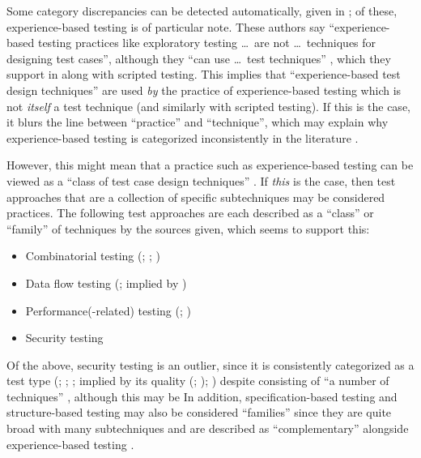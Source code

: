 

\ifnotpaper\else\fi

\label{multiCats}

Some category discrepancies can be detected automatically, given in
; of these, experience-based testing is of particular note.
\expBasedCatMain{} These authors say ``experience-based testing practices like
exploratory testing \dots\ are not \dots\ techniques for designing test cases'',
although they ``can use \dots\ test techniques'' \citeyearpar[p.~viii]{IEEE2021},
which they support in \citeyearpar[p.~33]{IEEE2022} along with scripted testing.
This implies that ``experience-based test design techniques'' are used \emph{by}
the practice of experience-based testing which is not \emph{itself} a test
technique (and similarly with scripted testing). If this is the case, it blurs
the line between ``practice'' and ``technique'', which may explain why
experience-based testing is categorized inconsistently in the literature%
.

\ifnotpaper
    \label{classFamilyDiscrep}
    However, this might mean that a practice such as experience-based testing
    can be viewed as a ``class of test case design techniques''
    \citep[p.~4]{IEEE2022}. If \emph{this} is the case, then test approaches
    that are a collection of specific subtechniques may be considered
    practices. The following test approaches are each described as a ``class''
    or ``family'' of techniques by the sources given, which seems to support
    this:
    \begin{itemize}
        \item Combinatorial testing (\citealp[p.~3]{IEEE2022};
              \citeyear[p.~2]{IEEE2021}; \citealp[p.~5-11]{SWEBOK2024})
        \item Data flow testing (\citeyear[p.~3]{IEEE2021};
              implied by \citealp[p.~5-13]{SWEBOK2024})
        \item Performance(-related) testing (\citealp[p.~38]{IEEE2021};
              \perfAsFamily*{})
        \item Security testing \citep[implied by][p.~40]{IEEE2021}
    \end{itemize}
    Of the above, security testing is an outlier, since it is consistently
    categorized as a test type (\citealp[pp.~9, 22, 26--27]{IEEE2022};
    \citeyear[pp.~7, 40, Tab.~A.1]{IEEE2021}; \citeyear[p.~405]{IEEE2017}%
    ; implied by its quality (\citealp{ISO_IEC2023a};
    \citealp[p.~13-4]{SWEBOK2024}); \citealp[p.~53]{Firesmith2015}) despite
    consisting of ``a number of techniques'' \cite[p.~40]{IEEE2021}, although
    this may be  In addition, specification-based
    testing and structure-based testing may also be considered ``families''
    since they are quite broad with many subtechniques and are described as
    ``complementary'' alongside experience-based testing
    \citep[p.~8, Fig.~2]{IEEE2021}.
\fi

